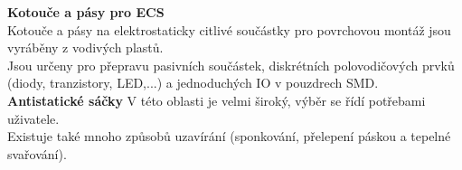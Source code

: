 \textbf{Kotouče a pásy pro ECS}\\
Kotouče a pásy na elektrostaticky citlivé součástky pro povrchovou montáž jsou
vyráběny z vodivých plastů.\\
Jsou určeny pro přepravu pasivních součástek, diskrétních polovodičových prvků
(diody, tranzistory, LED,...) a jednoduchých IO v pouzdrech SMD.\\

\textbf{Antistatické sáčky}
V této oblasti je velmi široký, výběr se řídí potřebami
uživatele.\\
Existuje také mnoho způsobů uzavírání (sponkování, přelepení páskou a tepelné svařování).\\

















